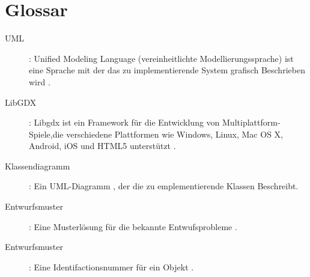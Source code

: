 \section{Glossar}
\begin{description}
\item[UML] :
Unified Modeling Language (vereinheitlichte Modellierungssprache) ist eine Sprache mit der das zu implementierende System grafisch Beschrieben wird .

\item[LibGDX] :
Libgdx ist ein Framework für die Entwicklung von Multiplattform-Spiele,die   verschiedene Plattformen wie  Windows, Linux, Mac OS X, Android, iOS und HTML5 unterstützt .
\item[Klassendiagramm] :
Ein UML-Diagramm , der die zu emplementierende Klassen Beschreibt.

\item[Entwurfsmuster] : 
Eine Musterlösung für die bekannte Entwufsprobleme .
\item[Entwurfsmuster] : 
Eine Identifactionsnummer für ein Objekt .


\end{description}